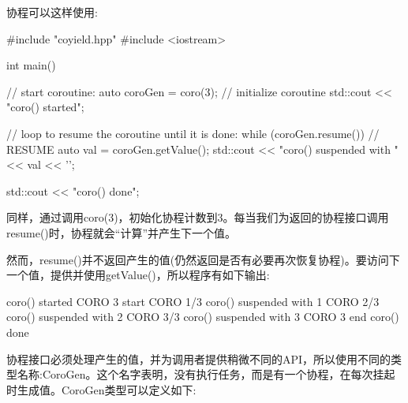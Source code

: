 协程可以这样使用:


\begin{cpp}
#include "coyield.hpp"
#include <iostream>

int main()
{
	// start coroutine:
	auto coroGen = coro(3); // initialize coroutine
	std::cout << "coro() started\n";
	
	// loop to resume the coroutine until it is done:
	while (coroGen.resume()) { // RESUME
		auto val = coroGen.getValue();
		std::cout << "coro() suspended with " << val << '\n';
	}
	
	std::cout << "coro() done\n";
}
\end{cpp}

同样，通过调用coro(3)，初始化协程计数到3。每当我们为返回的协程接口调用resume()时，协程就会“计算”并产生下一个值。

然而，resume()并不返回产生的值(仍然返回是否有必要再次恢复协程)。要访问下一个值，提供并使用getValue()，所以程序有如下输出:

\begin{shell}
coro() started
         CORO 3 start
         CORO 1/3
coro() suspended with 1
         CORO 2/3
coro() suspended with 2
         CORO 3/3
coro() suspended with 3
         CORO 3 end
coro() done
\end{shell}

协程接口必须处理产生的值，并为调用者提供稍微不同的API，所以使用不同的类型名称:CoroGen。这个名字表明，没有执行任务，而是有一个协程，在每次挂起时生成值。CoroGen类型可以定义如下:


